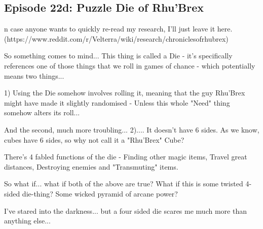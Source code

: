 \subsection{Episode 22d: Puzzle Die of Rhu'Brex}

n case anyone wants to quickly re-read my research, I'll just leave it here. (https://www.reddit.com/r/Velterra/wiki/research/chroniclesofrhubrex)\medskip

So something comes to mind... This thing is called a Die - it's specifically references one of those things that we roll in games of chance - which potentially means two things...\medskip

1) Using the Die somehow involves rolling it, meaning that the guy Rhu'Brex might have made it slightly randomised - Unless this whole "Need" thing somehow alters its roll...\medskip

And the second, much more troubling... 2).... It doesn't have 6 sides. As we know, cubes have 6 sides, so why not call it a "Rhu'Brex" Cube?\medskip

There's 4 fabled functions of the die - Finding other magic items, Travel great distances, Destroying enemies and "Transmuting" items.\medskip

So what if... what if both of the above are true? What if this is some twisted 4-sided die-thing? Some wicked pyramid of arcane power?\medskip

I've stared into the darkness... but a four sided die scares me much more than anything else...\medskip

\vspace*{5mm}
